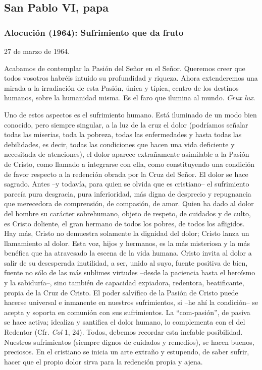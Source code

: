 			\subsection{San Pablo VI, papa }
			
			\subsubsection{Alocución (1964): Sufrimiento que da fruto}
			
			\begin{referencia}27 de marzo de 1964.\end{referencia}
			
			\begin{body} Acabamos de contemplar la Pasión del Señor en el Señor. Queremos creer que todos vosotros habréis intuido su profundidad y riqueza. Ahora extenderemos una mirada a la irradiación de esta Pasión, única y típica, centro de los destinos humanos, sobre la humanidad misma. Es el faro que ilumina al mundo. \textit{Crux lux}.\end{body}
			
			\begin{body}Uno de estos aspectos es el sufrimiento humano. Está iluminado de un modo bien conocido, pero siempre singular, a la luz de la cruz el dolor (podríamos señalar todas las miserias, toda la pobreza, todas las enfermedades y hasta todas las debilidades, es decir, todas las condiciones que hacen una vida deficiente y necesitada de atenciones), el dolor aparece extrañamente asimilable a la Pasión de Cristo, como llamado a integrarse con ella, como constituyendo una condición de favor respecto a la redención obrada por la Cruz del Señor. El dolor se hace sagrado. Antes –y todavía, para quien se olvida que es cristiano– el sufrimiento parecía pura desgracia, pura inferioridad, más digna de desprecio y repugnancia que merecedora de comprensión, de compasión, de amor. Quien ha dado al dolor del hombre su carácter sobrehumano, objeto de respeto, de cuidados y de culto, es Cristo doliente, el gran hermano de todos los pobres, de todos los afligidos. Hay más, Cristo no demuestra solamente la dignidad del dolor; Cristo lanza un llamamiento al dolor. Esta voz, hijos y hermanos, es la más misteriosa y la más benéfica que ha atravesado la escena de la vida humana. Cristo invita al dolor a salir de su desesperada inutilidad, a ser, unido al suyo, fuente positiva de bien, fuente no sólo de las más sublimes virtudes –desde la paciencia hasta el heroísmo y la sabiduría–, sino también de capacidad expiadora, redentora, beatificante, propia de la Cruz de Cristo. El poder salvífico de la Pasión de Cristo puede hacerse universal e inmanente en nuestros sufrimientos, si –he ahí la condición– se acepta y soporta en comunión con sus sufrimientos. La “com-pasión”, de pasiva se hace activa; idealiza y santifica el dolor humano, lo complementa con el del Redentor (Cfr. \textit{Col} 1, 24). Todos, debemos recordar esta inefable posibilidad. Nuestros sufrimientos (siempre dignos de cuidados y remedios), se hacen buenos, preciosos. En el cristiano se inicia un arte extraño y estupendo, de saber sufrir, hacer que el propio dolor sirva para la redención propia y ajena.\end{body}
			
